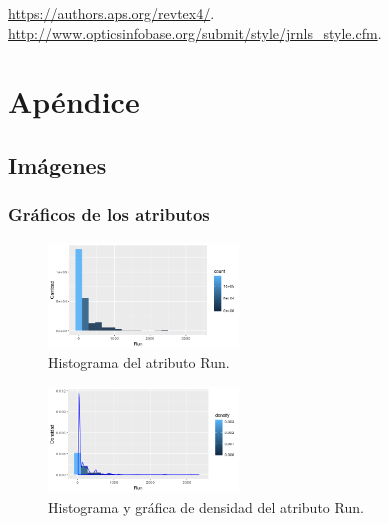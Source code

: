 \documentclass[osajnl,twocolumn,showpacs,superscriptaddress,10pt]{revtex4-1} %
\begin{document}
\begin{thebibliography}{99}

 \url{https://authors.aps.org/revtex4/}.
 \url{http://www.opticsinfobase.org/submit/style/jrnls_style.cfm}.

\end{thebibliography}

\clearpage

\onecolumngrid

\section{Apéndice}

\subsection{Imágenes} \label{apendix:images}

\subsubsection{Gráficos de los atributos} \label{apendix:images:attr}

\twocolumngrid

\begin{figure}[H]
    \centering
    \includegraphics[width=0.45\textwidth]{plots/run_hist}
    \caption{Histograma del atributo Run.}
    \label{figure:run_hist}
\end{figure}

\begin{figure}[H]
    \centering
    \includegraphics[width=0.45\textwidth]{plots/run_density}
    \caption{Histograma y gráfica de densidad del atributo Run.}
    \label{figure:run_density}
\end{figure}
\end{document}
